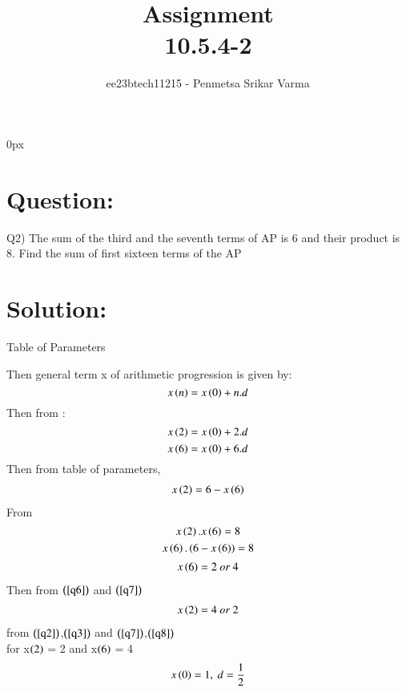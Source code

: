 \documentclass[beamer]{IEEEtran}
\theoremstyle{remark}
\begin{document}
\parindent 0px


\title{Assignment\\[1ex]10.5.4-2}
\author{ee23btech11215 - Penmetsa Srikar Varma$^{}$%
}
\maketitle
\newpage
\bigskip

\renewcommand{\thefigure}{\theenumi}
\renewcommand{\thetable}{\theenumi}
\section*{Question:}
Q2) The sum of the third and the seventh terms of AP is 6 and their product is 8. Find the sum of first sixteen terms of the AP\\
\section*{Solution:}
{
\centering
Table of Parameters\\
}
\begin{table}[h]
    \centering
    
    \label{tab:my_label}
\end{table}

Then general term x of arithmetic progression is given by:
\begin{equation}
\label{q1}
x\left(n\right)=x\left(0\right)+n.d
\end{equation}
Then from \brak{\ref{q1}}:
\begin{equation}
\label{q2}
x\left(2\right) = x\left(0\right)+2.d
\end{equation}
\begin{equation}
\label{q3}
x\left(6\right)=x\left(0\right)+6.d
\end{equation} 
Then from table of parameters,
\begin{align}
\label{q6}
    x\left(2\right)=6-x\left(6\right)
\end{align}
From \brak{\ref{q6}}
$$x\left(2\right).x\left(6\right)=8$$
$$x\left(6\right).\left(6-x\left(6\right)\right)=8$$
\begin{align}
\label{q7}
    x\left(6\right)=2\ or\ 4
\end{align}
Then from $\left(\ref{q6}\right)$ and $\left(\ref{q7}\right)$
\begin{align}
\label{q8}
    x\left(2\right)=4\ or\ 2
\end{align}
from $\left(\ref{q2}\right)$,$\left(\ref{q3}\right)$ and $\left(\ref{q7}\right)$,$\left(\ref{q8}\right)$\\
for x$\left(2\right)$ = 2 and x$\left(6\right)$ = 4
\begin{align}
x\left(0\right)=1,\ d=\frac{1}{2}
\end{align}
\end{document}
